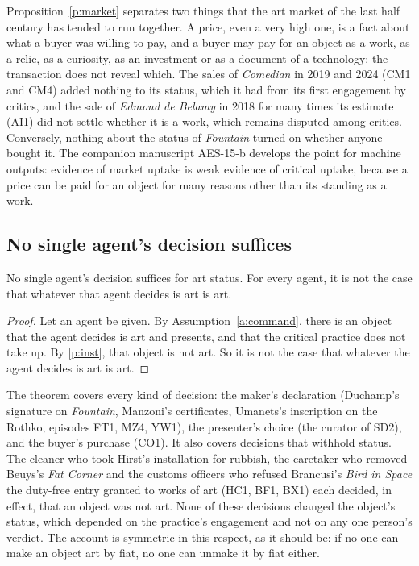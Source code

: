 \documentclass{situationist-preprint}
\begin{document}
Proposition~\ref{p:market} separates two things that the art market of the last half century has tended to run together. A price, even a very high one, is a fact about what a buyer was willing to pay, and a buyer may pay for an object as a work, as a relic, as a curiosity, as an investment or as a document of a technology; the transaction does not reveal which. The sales of \emph{Comedian} in 2019 and 2024 (CM1 and CM4) added nothing to its status, which it had from its first engagement by critics, and the sale of \emph{Edmond de Belamy} in 2018 for many times its estimate (AI1) did not settle whether it is a work, which remains disputed among critics. Conversely, nothing about the status of \emph{Fountain} turned on whether anyone bought it. The companion manuscript AES-15-b develops the point for machine outputs: evidence of market uptake is weak evidence of critical uptake, because a price can be paid for an object for many reasons other than its standing as a work.

\subsection{No single agent's decision suffices}

\begin{theorem}\label{t:single}
No single agent's decision suffices for art status. For every agent, it is not the case that whatever that agent decides is art is art.
\end{theorem}

\begin{proof}
Let an agent be given. By Assumption~\ref{a:command}, there is an object that the agent decides is art and presents, and that the critical practice does not take up. By \ref{p:inst}, that object is not art. So it is not the case that whatever the agent decides is art is art.
\end{proof}

The theorem covers every kind of decision: the maker's declaration (Duchamp's signature on \emph{Fountain}, Manzoni's certificates, Umanets's inscription on the Rothko, episodes FT1, MZ4, YW1), the presenter's choice (the curator of SD2), and the buyer's purchase (CO1). It also covers decisions that withhold status. The cleaner who took Hirst's installation for rubbish, the caretaker who removed Beuys's \emph{Fat Corner} and the customs officers who refused Brancusi's \emph{Bird in Space} the duty-free entry granted to works of art (HC1, BF1, BX1) each decided, in effect, that an object was not art. None of these decisions changed the object's status, which depended on the practice's engagement and not on any one person's verdict. The account is symmetric in this respect, as it should be: if no one can make an object art by fiat, no one can unmake it by fiat either.
\end{document}
